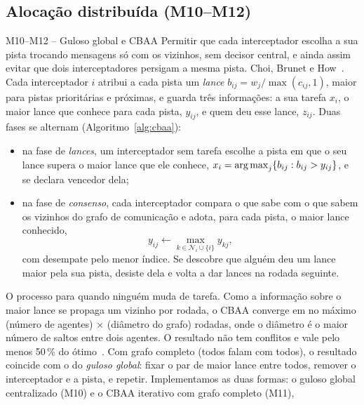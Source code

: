 \subsection{Alocação distribuída (M10--M12)}

\begin{metodo}{M10--M12 -- Guloso global e CBAA}
\ideia Permitir que cada interceptador escolha a sua pista trocando mensagens só com os vizinhos, sem decisor central, e
ainda assim evitar que dois interceptadores persigam a mesma pista.
\orig Choi, Brunet e How~\cite{choi2009}.
\func Cada interceptador $i$ atribui a cada pista um \emph{lance} $b_{ij}=w_j/\max(c_{ij},1)$, maior para pistas
prioritárias e próximas, e guarda três informações: a sua tarefa $x_i$, o maior lance que conhece para cada pista,
$y_{ij}$, e quem deu esse lance, $z_{ij}$. Duas fases se alternam (Algoritmo~\ref{alg:cbaa}):
\begin{itemize}
  \item na fase de \emph{lances}, um interceptador sem tarefa escolhe a pista em que o seu lance supera o maior lance que
        ele conhece, $x_i=\operatorname*{arg\,max}_j\{b_{ij}:b_{ij}>y_{ij}\}$, e se declara vencedor dela;
  \item na fase de \emph{consenso}, cada interceptador compara o que sabe com o que sabem os vizinhos do grafo de
        comunicação e adota, para cada pista, o maior lance conhecido,
        \begin{equation}
          y_{ij}\leftarrow\max_{k\in\mathcal{N}_i\cup\{i\}}y_{kj},
          \label{eq:consenso}
        \end{equation}
        com desempate pelo menor índice. Se descobre que alguém deu um lance maior pela sua pista, desiste dela e volta a
        dar lances na rodada seguinte.
\end{itemize}
O processo para quando ninguém muda de tarefa.
\prop Como a informação sobre o maior lance se propaga um vizinho por rodada, o CBAA converge em no máximo (número de
agentes) $\times$ (diâmetro do grafo) rodadas, onde o diâmetro é o maior número de saltos entre dois agentes. O resultado
não tem conflitos e vale pelo menos 50\,\% do ótimo~\cite{choi2009}. Com grafo completo (todos falam com todos), o
resultado coincide com o do \emph{guloso global}: fixar o par de maior lance entre todos, remover o interceptador e a pista,
e repetir.
\adap Implementamos as duas formas: o guloso global centralizado (M10) e o CBAA iterativo com grafo completo (M11),

\end{metodo}
